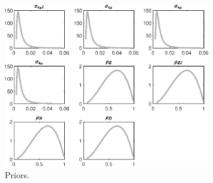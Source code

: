  
\begin{figure}[H]
\centering
\includegraphics[width=0.80\textwidth]{BRS_fd/graphs/BRS_fd_Priors1}
\caption{Priors.}\label{Fig:Priors:1}
\end{figure}
 
